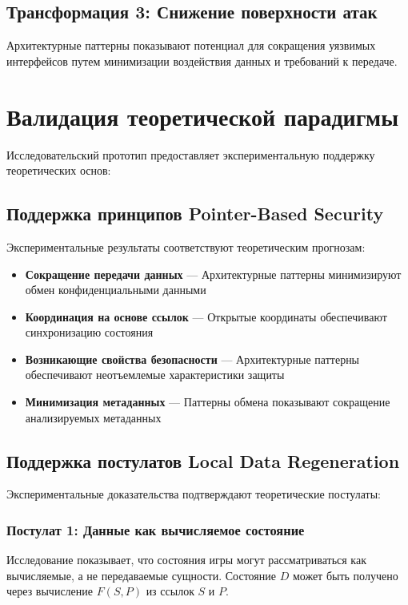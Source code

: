\documentclass[14pt, a4paper]{extarticle}
\begin{document}
\subsection{Трансформация 3: Снижение поверхности атак}
Архитектурные паттерны показывают потенциал для сокращения уязвимых интерфейсов путем минимизации воздействия данных и требований к передаче.

\section{Валидация теоретической парадигмы}

Исследовательский прототип предоставляет экспериментальную поддержку теоретических основ:

\subsection{Поддержка принципов Pointer-Based Security}

Экспериментальные результаты соответствуют теоретическим прогнозам:
\begin{itemize}
    \item \textbf{Сокращение передачи данных} — Архитектурные паттерны минимизируют обмен конфиденциальными данными
    \item \textbf{Координация на основе ссылок} — Открытые координаты обеспечивают синхронизацию состояния
    \item \textbf{Возникающие свойства безопасности} — Архитектурные паттерны обеспечивают неотъемлемые характеристики защиты
    \item \textbf{Минимизация метаданных} — Паттерны обмена показывают сокращение анализируемых метаданных
\end{itemize}

\subsection{Поддержка постулатов Local Data Regeneration}

Экспериментальные доказательства подтверждают теоретические постулаты:

\subsubsection{Постулат 1: Данные как вычисляемое состояние}
Исследование показывает, что состояния игры могут рассматриваться как вычисляемые, а не передаваемые сущности. Состояние $D$ может быть получено через вычисление $F(S, P)$ из ссылок $S$ и $P$.
\end{document}
